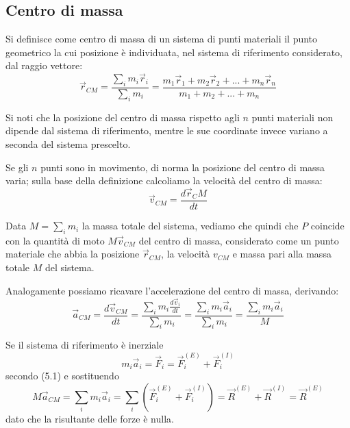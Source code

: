 \documentclass[class=book, crop=false, oneside, 12pt]{standalone}
\begin{document}
\subsection{Centro di massa}

Si definisce come centro di massa di un sistema di punti materiali il punto geometrico la cui posizione è individuata, nel sistema di riferimento considerato, dal raggio vettore:
\begin{equation}
    \overrightarrow{r}_{CM} = \frac{\sum_i {m_i \overrightarrow{r}_i}}{\sum_i m_i} = \frac{m_1 \overrightarrow{r}_1 + m_2 \overrightarrow{r}_2 + ... + m_n \overrightarrow{r}_n}{m_1 + m_2 + ... + m_n}
\end{equation}

Si noti che la posizione del centro di massa rispetto agli \(n\) punti materiali non dipende dal sistema di riferimento, mentre le sue coordinate invece variano a seconda del sistema prescelto.

Se gli \(n\) punti sono in movimento, di norma la posizione del centro di massa varia; sulla base della definizione calcoliamo la velocità del centro di massa:
\begin{equation}
    \overrightarrow{v}_{CM} = \frac{d \overrightarrow{r}_CM}{dt}
\end{equation}

Data \(M = \sum_i m_i\) la massa totale del sistema, vediamo che quindi che \(P\) coincide con la quantità di moto \(M \overrightarrow{v}_{CM}\) del centro di massa, considerato come un punto materiale che abbia la posizione \(\overrightarrow{r}_{CM}\), la velocità \(v_{CM}\) e massa pari alla massa totale \(M\) del sistema.

Analogamente possiamo ricavare l'accelerazione del centro di massa, derivando:
\begin{equation}
    \overrightarrow{a}_{CM} = \frac{d \overrightarrow{v}_{CM}}{dt} = \frac{\sum_i {m_i \frac{d \overrightarrow{v}_i}{dt}}}{\sum_i m_i} = \frac{\sum_i {m_i \overrightarrow{a}_i}}{\sum_i m_i} = \frac{\sum_i m_i \overrightarrow{a}_i}{M}
\end{equation}

Se il sistema di riferimento è inerziale
\begin{equation*}
    m_i \overrightarrow{a}_i = \overrightarrow{F}_i = \overrightarrow{F}_i^{(E)} + \overrightarrow{F}_i^{(I)}
\end{equation*}
secondo (5.1) e sostituendo
\begin{equation}
    M \overrightarrow{a}_{C M}=\sum_i m_{i} \overrightarrow{a}_{i}=\sum_{i}\left(\overrightarrow{F}_{i}^{(E)}+\overrightarrow{F}_{i}^{(I)}\right)=\overrightarrow{R}^{(E)}+\overrightarrow{R}^{(I)}=\overrightarrow{R}^{(E)}
\end{equation}
dato che la risultante delle forze è nulla. 
\end{document}
